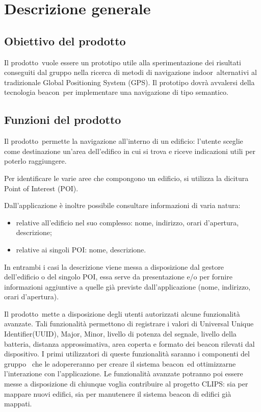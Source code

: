 \documentclass[../AnalisiDeiRequisiti.tex]{subfiles}
\begin{document}
\section{Descrizione generale}
	\subsection{Obiettivo del prodotto}
	Il prodotto\g\ vuole essere un prototipo utile alla sperimentazione dei risultati conseguiti dal gruppo nella ricerca di metodi di navigazione indoor\g\ alternativi al tradizionale Global Positioning System (GPS).
Il prototipo dovrà avvalersi della tecnologia beacon\g\ per implementare una navigazione di tipo semantico.

	\subsection{Funzioni del prodotto}
	Il prodotto\g\ permette la navigazione all’interno di un edificio: l’utente sceglie come destinazione un'area dell’edifico in cui si trova e riceve indicazioni utili per poterlo raggiungere. 
	
	Per identificare le varie aree che compongono un edificio, si utilizza la dicitura Point of Interest (POI\g).
	
	Dall'applicazione è inoltre possibile consultare informazioni di varia natura:
	\begin{itemize}
		\item relative all’edificio nel suo complesso: nome, indirizzo, orari d'apertura, descrizione;
		\item relative ai singoli POI\g: nome, descrizione.
	\end{itemize}
	In entrambi i casi la descrizione viene messa a disposizione dal gestore dell'edificio o del singolo POI\g, essa serve da presentazione e/o per fornire informazioni aggiuntive a quelle già previste dall'applicazione (nome, indirizzo, orari d'apertura). 
	
	Il prodotto\g\ mette a disposizione degli utenti autorizzati alcune funzionalità avanzate. Tali funzionalità permettono di registrare  i valori di Universal Unique Identifier(UUID), Major, Minor, livello di potenza del segnale, livello della batteria, distanza approssimativa, area coperta e formato dei beacon rilevati dal dispositivo. I primi utilizzatori di queste funzionalità saranno i componenti del gruppo \leaf\ che le adopereranno per creare il sistema beacon\g\ ed ottimizzarne l'interazione con l'applicazione. Le funzionalità avanzate potranno poi essere messe a disposizione di chiunque voglia contribuire al progetto CLIPS: sia per mappare nuovi edifici, sia per manutenere il sistema beacon di edifici già mappati.
		
\end{document}
